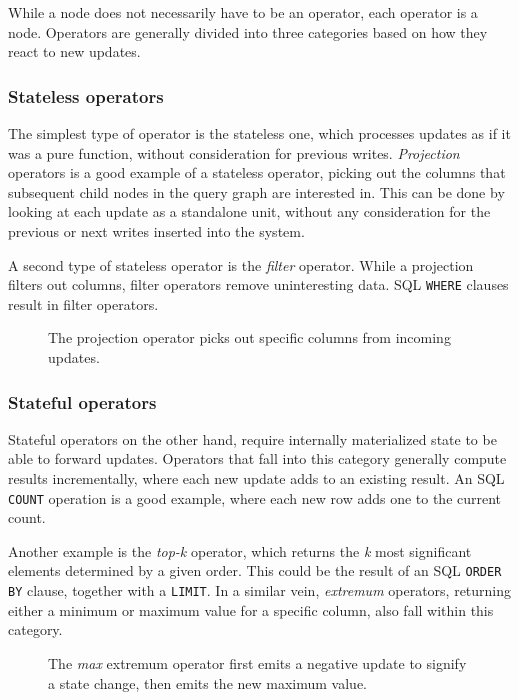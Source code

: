 \documentclass[b5paper]{report}
\begin{document}
While a node does not necessarily have to be an operator, each operator is a
node. Operators are generally divided into three categories based on how they
react to new updates.

\subsubsection{Stateless operators}
The simplest type of operator is the stateless one, which processes updates as
if it was a pure function, without consideration for previous writes.
\textit{Projection} operators is a good example of a stateless operator, picking
out the columns that subsequent child nodes in the query graph are interested
in. This can be done by looking at each update as a standalone unit, without any
consideration for the previous or next writes inserted into the system.

A second type of stateless operator is the \textit{filter} operator. While a
projection filters out columns, filter operators remove uninteresting data. SQL
\texttt{WHERE} clauses result in filter operators.

\begin{figure}[H]
  \centering
  
  \caption{
    The projection operator picks out specific columns from incoming updates.
  }
\end{figure}

\subsubsection{Stateful operators}
Stateful operators on the other hand, require internally materialized state to
be able to forward updates. Operators that fall into this category generally
compute results incrementally, where each new update adds to an existing
result. An SQL \texttt{COUNT} operation is a good example, where each new row
adds one to the current count.

Another example is the \textit{top-k} operator, which returns the \textit{k}
most significant elements determined by a given order. This could be the result
of an SQL \texttt{ORDER BY} clause, together with a \texttt{LIMIT}. In a similar
vein, \textit{extremum} operators, returning either a minimum or maximum value
for a specific column, also fall within this category.

\begin{figure}[H]
  \centering
  
  \caption{
    The \textit{max} extremum operator first emits a negative update to signify a state
    change, then emits the new maximum value.
  }
\end{figure}
\end{document}
